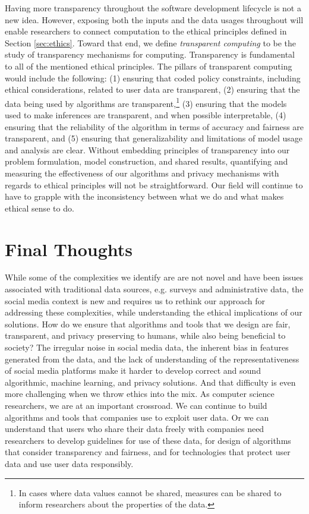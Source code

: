 \documentclass[11pt]{article} %
\begin{document}
Having more transparency throughout the software development lifecycle is not a new idea. However, exposing both the inputs and the data usages throughout will enable researchers to connect computation to the ethical principles defined in Section \ref{sec:ethics}. Toward that end, we define \textit{transparent computing} to be the study of transparency mechanisms for computing. Transparency is fundamental to all of the mentioned ethical principles. The pillars of transparent computing would include the following: (1) ensuring that coded policy constraints, including ethical considerations, related to user data are transparent, (2) ensuring that the data being used by algorithms are transparent,\footnote{In cases where data values cannot be shared, measures can be shared to inform researchers about the properties of the data.} (3) ensuring that the models used to make inferences are transparent, and when possible interpretable, (4) ensuring that the reliability of the algorithm in terms of accuracy and fairness are transparent, and (5) ensuring that generalizability and limitations of model usage and analysis are clear. Without embedding principles of transparency into our problem formulation, model construction, and shared results, quantifying and measuring the effectiveness of our algorithms and privacy mechanisms with regards to ethical principles will not be straightforward. Our field will continue to have to grapple with the inconsistency between what we do and what makes ethical sense to do.

\section{Final Thoughts}
While some of the complexities we identify are are not novel and have been issues associated with traditional data sources, e.g. surveys and administrative data, the social media context is new and requires us to rethink our approach for addressing these complexities, while understanding the ethical implications of our solutions. 
How do we ensure that algorithms and tools that we design are fair, transparent, and privacy preserving to humans, while also being beneficial to society? The irregular noise in social media data, the inherent bias in features generated from the data, and the lack of understanding of the representativeness of social media platforms make it harder to develop correct and sound algorithmic, machine learning, and privacy solutions. And that difficulty is even more challenging when we throw ethics into the mix. As computer science researchers, we are at an important crossroad. We can continue to build algorithms and tools that companies use to exploit user data. Or we can understand that users who share their data freely with companies need researchers to develop guidelines for use of these data, for design of algorithms that consider transparency and fairness, and for technologies that protect user data and use user data responsibly. 
\end{document}
